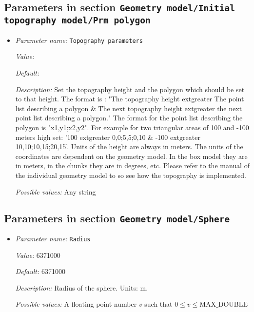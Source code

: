 \subsection{Parameters in section \tt Geometry model/Initial topography model/Prm polygon}
\label{parameters:Geometry_20model/Initial_20topography_20model/Prm_20polygon}

\begin{itemize}
\item {\it Parameter name:} {\tt Topography parameters}
\label{parameters:Geometry model/Initial topography model/Prm polygon/Topography parameters}


{\it Value:} 


{\it Default:} 


{\it Description:} Set the topography height and the polygon which should be set to that height. The format is : "The topography height 	extgreater The point list describing a polygon \& The next topography height 	extgreater the next point list describing a polygon." The format for the point list describing the polygon is "x1,y1;x2,y2". For example for two triangular areas of 100 and -100 meters high set: '100 	extgreater 0,0;5,5;0,10 \& -100 	extgreater 10,10;10,15;20,15'. Units of the height are always in meters. The units of the coordinates are dependent on the geometry model. In the box model they are in meters, in the chunks they are in degrees, etc. Please refer to the manual of the individual geometry model to so see how the topography is implemented.


{\it Possible values:} Any string
\end{itemize}

\subsection{Parameters in section \tt Geometry model/Sphere}
\label{parameters:Geometry_20model/Sphere}

\begin{itemize}
\item {\it Parameter name:} {\tt Radius}
\label{parameters:Geometry model/Sphere/Radius}


{\it Value:} 6371000


{\it Default:} 6371000


{\it Description:} Radius of the sphere. Units: m.


{\it Possible values:} A floating point number $v$ such that $0 \leq v \leq \text{MAX\_DOUBLE}$
\end{itemize}

